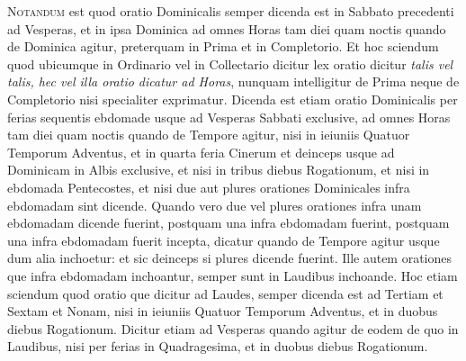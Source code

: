 \begin{multicols*}{2}
{\color{Red} }
\lettrine[lines=2]{\zallmancaps \color{Blue} N}{otandum} est quod oratio Dominicalis semper dicenda est in Sabbato precedenti ad Vesperas, et in ipsa Dominica ad omnes Horas tam diei quam noctis quando de Dominica agitur, preterquam in Prima et in Completorio. Et hoc sciendum quod ubicumque in Ordinario vel in Collectario dicitur lex oratio dicitur \textit{talis vel talis, hec vel illa oratio dicatur ad Horas}, nunquam intelligitur de Prima neque de Completorio nisi specialiter exprimatur. Dicenda est etiam oratio Dominicalis per ferias sequentis ebdomade usque ad Vesperas Sabbati exclusive, ad omnes Horas tam diei quam noctis quando de Tempore agitur, nisi in ieiuniis Quatuor Temporum Adventus, et in quarta feria Cinerum et deinceps usque ad Dominicam in Albis exclusive, et nisi in tribus diebus Rogationum, et nisi in ebdomada Pentecostes, et nisi due aut plures orationes Dominicales infra ebdomadam sint dicende. Quando vero due vel plures orationes infra unam ebdomadam dicende fuerint, postquam una infra ebdomadam fuerint, postquam una infra ebdomadam fuerit incepta, dicatur quando de Tempore agitur usque dum alia inchoetur: et sic deinceps si plures dicende fuerint.
Ille autem orationes que infra ebdomadam inchoantur, semper sunt in Laudibus inchoande. Hoc etiam sciendum quod oratio que dicitur ad Laudes, semper dicenda est ad Tertiam et Sextam et Nonam, nisi in ieiuniis Quatuor Temporum Adventus, et in duobus diebus Rogationum. Dicitur etiam ad Vesperas quando agitur de eodem de quo in Laudibus, nisi per ferias in Quadragesima, et in duobus diebus Rogationum.


\end{multicols*}

